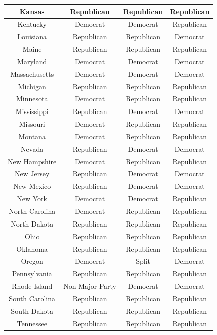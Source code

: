 \documentclass[]{book}
\theoremstyle{definition}
\theoremstyle{definition}
\theoremstyle{definition}
\theoremstyle{remark}
\begin{document}
\begin{enumerate}
\begin{table}
\begin{tabular}[t]{c|c|c|c}
  \hline
  Kansas & Republican & Republican & Republican\\
  \hline
  Kentucky & Democrat & Democrat & Republican\\
  \hline
  Louisiana & Republican & Republican & Democrat\\
  \hline
  Maine & Republican & Republican & Republican\\
  \hline
  Maryland & Democrat & Democrat & Democrat\\
  \hline
  Massachusetts & Democrat & Democrat & Democrat\\
  \hline
  Michigan & Republican & Republican & Republican\\
  \hline
  Minnesota & Democrat & Republican & Republican\\
  \hline
  Mississippi & Republican & Democrat & Democrat\\
  \hline
  Missouri & Democrat & Republican & Republican\\
  \hline
  Montana & Democrat & Republican & Republican\\
  \hline
  Nevada & Republican & Democrat & Democrat\\
  \hline
  New Hampshire & Democrat & Republican & Republican\\
  \hline
  New Jersey & Republican & Democrat & Democrat\\
  \hline
  New Mexico & Republican & Democrat & Democrat\\
  \hline
  New York & Democrat & Democrat & Republican\\
  \hline
  North Carolina & Democrat & Republican & Republican\\
  \hline
  North Dakota & Republican & Republican & Republican\\
  \hline
  Ohio & Republican & Republican & Republican\\
  \hline
  Oklahoma & Republican & Republican & Republican\\
  \hline
  Oregon & Democrat & Split & Democrat\\
  \hline
  Pennsylvania & Republican & Republican & Republican\\
  \hline
  Rhode Island & Non-Major Party & Democrat & Democrat\\
  \hline
  South Carolina & Republican & Republican & Republican\\
  \hline
  South Dakota & Republican & Republican & Republican\\
  \hline
  Tennessee & Republican & Republican & Republican\\

\end{tabular}
\end{table}
\end{enumerate}
\end{document}
